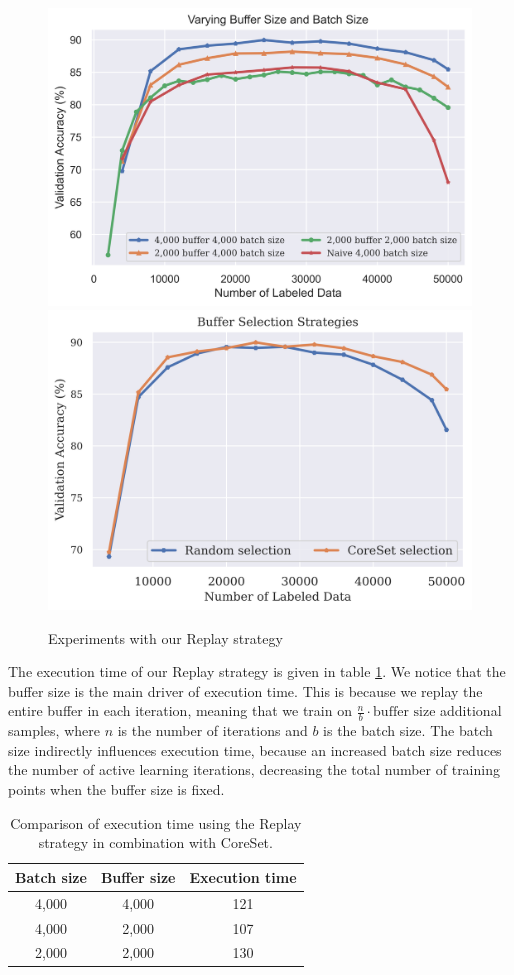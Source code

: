 \begin{figure}[h]
    \centering
    \includegraphics[width=0.45\linewidth]{images/results_CAL/replay_varying_batch_size.png} \hfill
    \includegraphics[width=0.45\linewidth]{images/results_CAL/replay_buffer_selection.png}
    \caption{Experiments with our Replay strategy}
    \label{fig:Evaluation:CAL:Replay}
\end{figure}

The execution time of our Replay strategy is given in table \ref{fig:Evaluation:CAL:Replay_Time}. We notice that the buffer size is the main driver of execution time. This is because
we replay the entire buffer in each iteration, meaning that we train on $\frac{n}{b} \cdot \text{buffer size}$ additional samples, where $n$ is the number of iterations and $b$ is
the batch size. The batch size indirectly influences execution time, because an increased batch size reduces the number of active learning iterations, decreasing the total
number of training points when the buffer size is fixed. \par

\begin{table}[h]
    \centering
    \begin{tabular}{c | c  c} 
        Batch size & Buffer size & Execution time\\ 
        \hline 
        4,000 & 4,000 & 121 \\
        4,000 & 2,000 & 107 \\
        2,000 & 2,000 & 130 \\
    \end{tabular}
    \caption{Comparison of execution time using the Replay strategy in combination with CoreSet.}
    \label{fig:Evaluation:CAL:Replay_Time}
\end{table}


